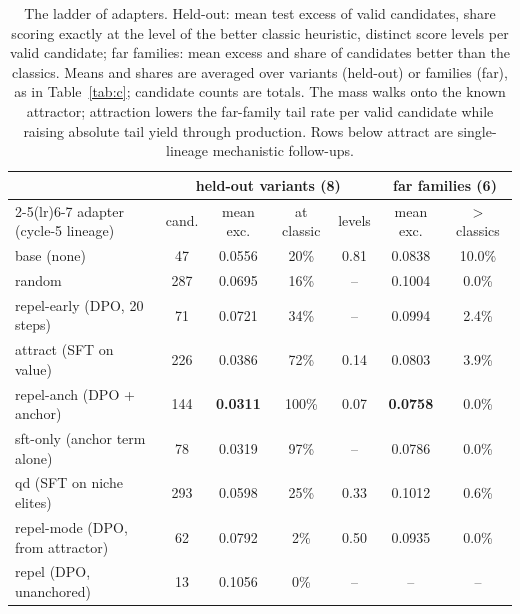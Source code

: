 \documentclass[11pt]{article}
\begin{document}
\begin{table}[t]
\centering\footnotesize
\setlength{\tabcolsep}{4.5pt}
\begin{tabular}{@{}lcccccc@{}}
\toprule
 & \multicolumn{4}{c}{held-out variants (8)} & \multicolumn{2}{c}{far families (6)} \\
\cmidrule(lr){2-5}\cmidrule(lr){6-7}
adapter (cycle-5 lineage) & cand. & mean exc. & at classic & levels & mean exc. & $>$ classics \\
\midrule
base (none) & 47 & 0.0556 & 20\% & 0.81 & 0.0838 & 10.0\% \\
random & 287 & 0.0695 & 16\% & -- & 0.1004 & 0.0\% \\
repel-early (DPO, 20 steps) & 71 & 0.0721 & 34\% & -- & 0.0994 & 2.4\% \\
attract (SFT on value) & 226 & 0.0386 & 72\% & 0.14 & 0.0803 & 3.9\% \\
repel-anch (DPO + anchor) & 144 & \textbf{0.0311} & 100\% & 0.07 & \textbf{0.0758} & 0.0\% \\
sft-only (anchor term alone) & 78 & 0.0319 & 97\% & -- & 0.0786 & 0.0\% \\
qd (SFT on niche elites) & 293 & 0.0598 & 25\% & 0.33 & 0.1012 & 0.6\% \\
repel-mode (DPO, from attractor) & 62 & 0.0792 & 2\% & 0.50 & 0.0935 & 0.0\% \\
repel (DPO, unanchored) & 13 & 0.1056 & 0\% & -- & -- & -- \\
\bottomrule
\end{tabular}
\caption{The ladder of adapters. Held-out: mean test excess of valid
candidates, share scoring exactly at the level of the better classic
heuristic, distinct score levels per valid candidate; far families: mean
excess and share of candidates better than the classics. Means and shares
are averaged over variants (held-out) or families (far), as in
Table~\ref{tab:c}; candidate counts are totals. The mass walks
onto the known attractor; attraction lowers the far-family tail rate per
valid candidate while raising absolute tail yield through production.
Rows below attract are single-lineage mechanistic follow-ups.}
\label{tab:ladder}
\end{table}
\end{document}
